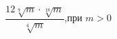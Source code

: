 \begin{ex}[type=calculate_expression]
	\begin{condition}
		\( \dfrac{12\sqrt[9]{m}\cdot\sqrt[18]{m}}{\sqrt[6]{m}} \),\quad при  \( m>0 \)
	\end{condition}
\end{ex}